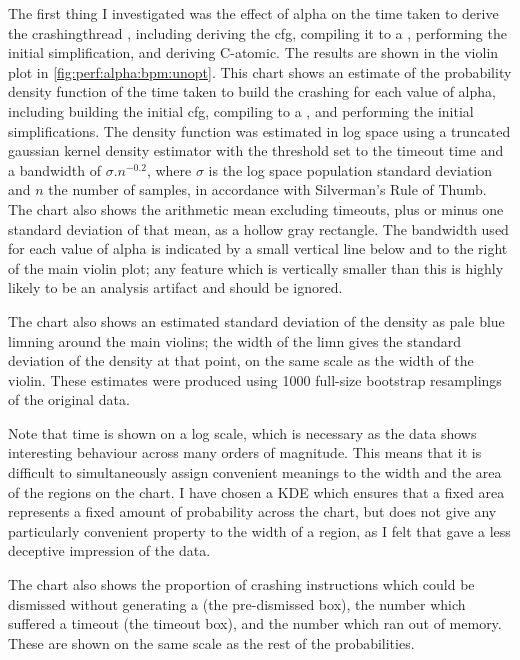 The first thing I investigated was the effect of \gls{alpha} on the
time taken to derive the \gls{crashingthread} {\StateMachines},
including deriving the \gls{cfg}, compiling it to a {\StateMachine},
performing the initial simplification, and deriving C-atomic.  The
results are shown in the violin plot in
\autoref{fig:perf:alpha:bpm:unopt}.  This chart shows an estimate of
the probability density function of the time taken to build the
crashing {\StateMachines} for each value of \gls{alpha}, including
building the initial \gls{cfg}, compiling to a {\StateMachine}, and
performing the initial simplifications.  The density function was
estimated in log space using a truncated gaussian kernel density
estimator with the threshold set to the timeout time and a bandwidth
of $\sigma.n^{-0.2}$, where $\sigma$ is the log space population
standard deviation and $n$ the number of samples, in accordance with
Silverman's Rule of Thumb\needCite{}.  The chart also shows the
arithmetic mean excluding timeouts, plus or minus one standard
deviation of that mean, as a hollow gray rectangle.  The bandwidth
used for each value of \gls{alpha} is indicated by a small vertical
line below and to the right of the main violin plot; any feature which
is vertically smaller than this is highly likely to be an analysis
artifact and should be ignored.

The chart also shows an estimated standard deviation of the density as
pale blue limning around the main violins; the width of the limn gives
the standard deviation of the density at that point, on the same scale
as the width of the violin.  These estimates were produced using 1000
full-size bootstrap resamplings of the original data.

Note that time is shown on a log scale, which is necessary as the data
shows interesting behaviour across many orders of magnitude.  This
means that it is difficult to simultaneously assign convenient
meanings to the width and the area of the regions on the chart.  I
have chosen a KDE which ensures that a fixed area represents a fixed
amount of probability across the chart, but does not give any
particularly convenient property to the width of a region, as I felt
that gave a less deceptive impression of the data.

The chart also shows the proportion of crashing instructions which
could be dismissed without generating a {\StateMachine} (the
pre-dismissed box), the number which suffered a timeout (the timeout
box), and the number which ran out of memory.  These are shown on the
same scale as the rest of the probabilities.

